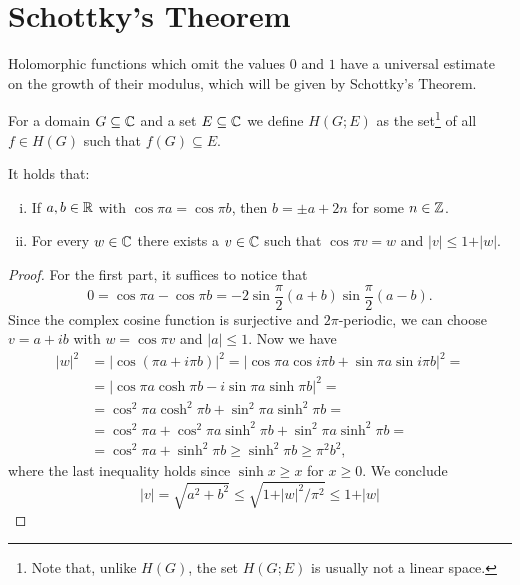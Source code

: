 \section{Schottky's Theorem}
\label{sec:schottkys-theorem}

Holomorphic functions which omit the values $0$ and $1$ have a universal estimate on the growth of their modulus, which will be given by Schottky's Theorem.

For a domain $G \subseteq \mathbb{C}$ and a set $E \subseteq \mathbb{C}$ we define $H(G; E)$ as the set\footnote{Note that, unlike $H(G)$, the set $H(G; E)$ is usually not a linear space.} of all $f \in H(G)$ such that $f(G) \subseteq E$.

\begin{lemma} \label{lem:schottky-1}
    It holds that:
    \begin{enumerate}[i.]
        \item If $a, b \in \mathbb{R}$ with $\cos \pi a = \cos \pi b$, then $b = \pm a + 2n$ for some $n \in \mathbb{Z}$.
        \item For every $w \in \mathbb{C}$ there exists a $v \in \mathbb{C}$ such that $\cos \pi v = w$ and $\vert v \vert \leq 1 + \vert w \vert$.
    \end{enumerate}
\end{lemma}

\begin{proof}
    For the first part, it suffices to notice that
    $$ 0 = \cos \pi a - \cos \pi b = \textstyle -2 \sin \frac{\pi}{2} ( a + b ) \sin \frac{\pi}{2} ( a - b ). $$
    Since the complex cosine function is surjective and $2 \pi$-periodic, we can choose $v = a + i b$ with $w = \cos \pi v$ and $\vert a \vert \leq 1$. Now we have
    \begin{align*}
        \vert w \vert^2 &= \vert \cos (\pi a + i \pi b) \vert^2 = \vert \cos \pi a \cos i \pi b + \sin \pi a \sin i \pi b \vert^2 = \\
        &= \vert \cos \pi a \cosh \pi b - i \sin \pi a \sinh \pi b \vert^2 = \\
        &= \cos^2 \pi a \cosh^2 \pi b + \sin^2 \pi a \sinh^2 \pi b = \\
        &= \cos^2 \pi a + \cos^2 \pi a \sinh^2 \pi b + \sin^2 \pi a \sinh^2 \pi b = \\
        &= \cos^2 \pi a + \sinh^2 \pi b \geq \sinh^2 \pi b \geq \pi^2 b^2,
    \end{align*}
    where the last inequality holds since $\sinh x \geq x$ for $x \geq 0$. We conclude
    \begin{equation*}
        \vert v \vert = \sqrt{a^2 + b^2} \leq \sqrt{1 + \vert w \vert^2 / \pi^2} \leq 1 + \vert w \vert
    \end{equation*}
\end{proof}

